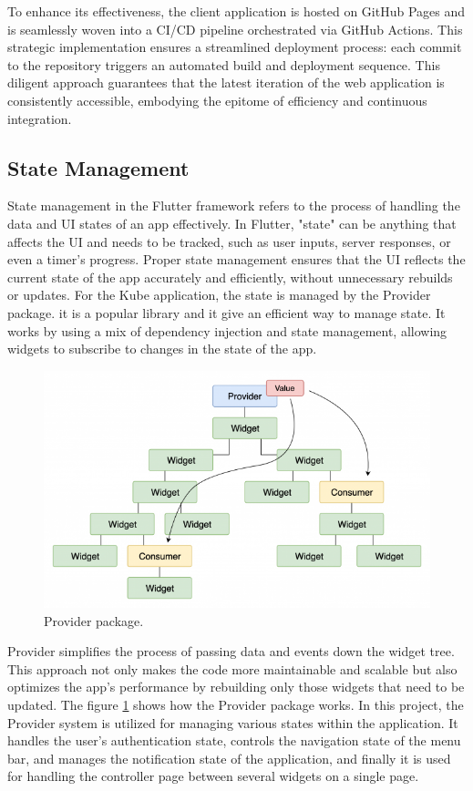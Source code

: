 To enhance its effectiveness, the client application is hosted on GitHub Pages and is seamlessly
woven into a CI/CD pipeline orchestrated via GitHub Actions. This strategic implementation ensures a
streamlined deployment process: each commit to the repository triggers an automated build and
deployment sequence. This diligent approach guarantees that the latest iteration of the web
application is consistently accessible, embodying the epitome of efficiency and continuous
integration.

\subsection{State Management}
State management in the Flutter framework refers to the process of handling the data and UI states
of an app effectively. In Flutter, "state" can be anything that affects the UI and needs to be
tracked, such as user inputs, server responses, or even a timer's progress. Proper state management
ensures that the UI reflects the current state of the app accurately and efficiently, without
unnecessary rebuilds or updates. For the Kube application, the state is managed by the Provider
package. it is a popular library and it give an efficient way to manage state. It works by using a
mix of dependency injection and state management, allowing widgets to subscribe to changes in the
state of the app.

\begin{figure}
    \centering
    \includegraphics[scale=0.5]{Pictures/5_provider.png}
    \caption{Provider package.}
    \label{fig:5_provider}
\end{figure}

Provider simplifies the process of passing data and events down the widget tree.
This approach not only makes the code more maintainable and scalable but also optimizes the app's
performance by rebuilding only those widgets that need to be updated. The figure
\ref{fig:5_provider} shows how the Provider package works.
In this project, the Provider system is utilized for managing various states within the application.
It handles the user's authentication state, controls the navigation state of the menu bar, and
manages the notification state of the application, and finally it is used for handling the
controller page between several widgets on a single page.

